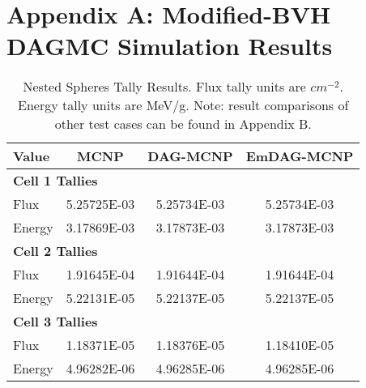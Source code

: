 
\chapter{Appendix A: Modified-BVH DAGMC Simulation Results}\label{ch:appendix_a}



\begin{table}[H]
  \small
  \begin{center}
    \begin{tabular}{lccc}
      \toprule
      Value & MCNP & DAG-MCNP & EmDAG-MCNP \\
      \toprule
      \multicolumn{4}{l}{\textbf{Cell 1 Tallies}} \\
      \hline
      Flux  & 5.25725E-03 & 5.25734E-03 & 5.25734E-03 \\
      Energy  & 3.17869E-03 &  3.17873E-03 &  3.17873E-03 \\
      \hline
      \multicolumn{4}{l}{\textbf{Cell 2 Tallies}} \\
      \hline
      Flux  & 1.91645E-04 & 1.91644E-04 & 1.91644E-04 \\
      Energy  & 5.22131E-05 & 5.22137E-05 & 5.22137E-05 \\
      \hline
      \multicolumn{4}{l}{\textbf{Cell 3 Tallies}} \\
      \hline
      Flux  & 1.18371E-05 & 1.18376E-05 & 1.18410E-05 \\
      Energy  & 4.96282E-06 & 4.96285E-06 & 4.96285E-06 \\
      \bottomrule
                        
    \end{tabular}
    \caption{Nested Spheres Tally Results. Flux tally units are
      $cm^{-2}$. Energy tally units are MeV/g. Note: result comparisons of other
      test cases can be found in Appendix B.}
    \label{nestedspheres}
  \end{center}
\end{table}


